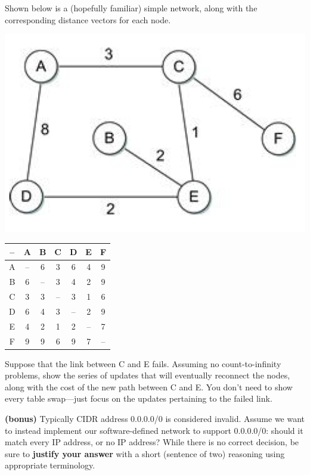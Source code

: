 \documentclass[12pt,addpoints,answers]{exam}
\begin{document}
\begin{questions}
\question[15] Shown below is a (hopefully familiar) simple network, along with the corresponding distance vectors for each node.
\begin{center}
\begin{minipage}{0.45\linewidth}\includegraphics[width=0.9\linewidth]{fig/distance.png}\end{minipage}
\begin{minipage}{0.45\linewidth}
\begin{tabular}{c|cccccc}
\toprule
-- & A        & B        & C        & D        & E        & F        \\
\midrule
A  & --       & 6        & 3        & 6        & 4        & 9        \\
B  & 6        & --       & 3        & 4        & 2        & 9        \\
C  & 3        & 3        & --       & 3        & 1        & 6        \\
D  & 6        & 4        & 3        & --       & 2        & 9        \\
E  & 4        & 2        & 1        & 2        & --       & 7        \\
F  & 9        & 9        & 6        & 9        & 7        & --       \\
\bottomrule
\end{tabular}
\end{minipage}
\end{center}
Suppose that the link between C and E fails. Assuming no count-to-infinity problems, show the series of updates that will eventually reconnect the nodes, along with the cost of the new path between C and E. You don't need to show every table swap---just focus on the updates pertaining to the failed link.
\begin{solution}[5in]
\end{solution}


\bonusquestion \textbf{(bonus)} Typically CIDR address 0.0.0.0/0 is considered invalid. Assume we want to instead implement our software-defined network to support 0.0.0.0/0: should it match every IP address, or no IP address? While there is no correct decision, be sure to \textbf{justify your answer} with a short (sentence of two) reasoning using appropriate terminology.


\end{questions}
\end{document}
